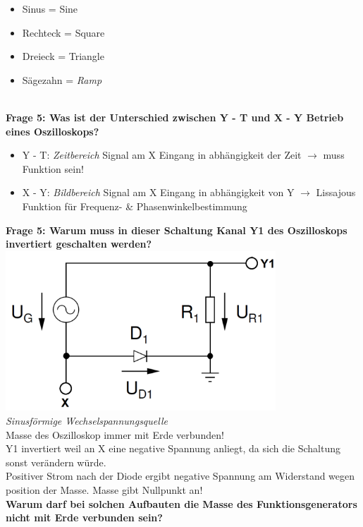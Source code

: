 \documentclass[11pt,a4paper]{scrartcl}
\begin{document}
    \hfill 
    \begin{minipage}{0.49\linewidth} 
      \begin{itemize}
				\item Sinus = Sine
				\item Rechteck = Square
				\item Dreieck = Triangle
				\item Sägezahn = \textit{Ramp}
			\end{itemize}
    \end{minipage} \\
\textbf{Frage 5: Was ist der Unterschied zwischen Y - T und X - Y Betrieb eines Oszilloskops?}
\begin{itemize}
	\item Y - T: \textit{Zeitbereich} Signal am X Eingang in abhängigkeit der Zeit $\rightarrow$ muss Funktion sein!
	\item X - Y: \textit{Bildbereich} Signal am X Eingang in abhängigkeit von Y $\rightarrow$ Lissajous Funktion für Frequenz- \& Phasenwinkelbestimmung
\end{itemize}
\textbf{Frage 5: Warum muss in dieser Schaltung Kanal Y1 des Oszilloskops invertiert geschalten werden?}\\
\includegraphics[height=6cm,keepaspectratio]{Oszi_Schaltung.png}\\
\textit{Sinusförmige Wechselspannungsquelle}\\
Masse des Oszilloskop immer mit Erde verbunden!\\
Y1 invertiert weil an X eine negative Spannung anliegt, da sich die Schaltung sonst verändern würde.\\
Positiver Strom nach der Diode ergibt negative Spannung am Widerstand wegen position der Masse. Masse gibt Nullpunkt an!\\
\textbf{Warum darf bei solchen Aufbauten die Masse des Funktionsgenerators nicht mit Erde verbunden sein?}\\
\end{document}

